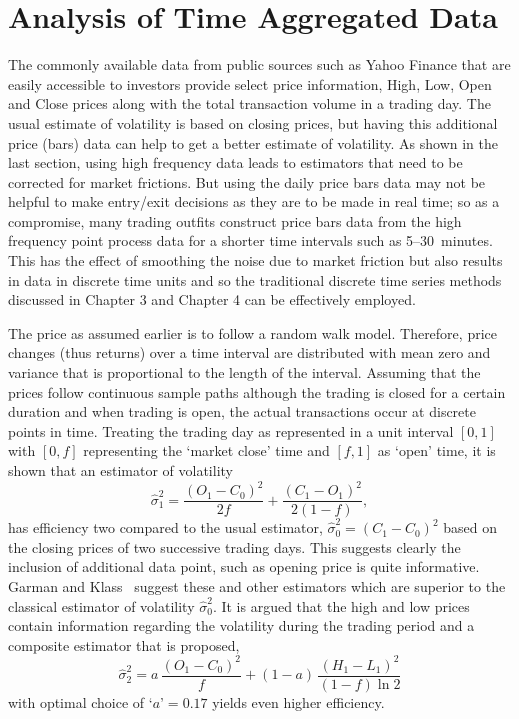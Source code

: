 \section{Analysis of Time Aggregated Data \label{s:analysis_tad}}

The commonly available data from public sources such as Yahoo Finance that are easily accessible to investors provide select price information, High, Low, Open and Close prices along with the total transaction volume in a trading day. The usual estimate of volatility is based on closing prices, but having this additional price (bars) data can help to get a better estimate of volatility. As shown in the last section, using high frequency data leads to estimators that need to be corrected for market frictions. But using the daily price bars data may not be helpful to make entry/exit decisions as they are to be made in real time; so as a compromise, many trading outfits construct price bars data from the high frequency point process data for a shorter time intervals such as 5--30~minutes. This has the effect of smoothing the noise due to market friction but also results in data in discrete time units and so the traditional discrete time series methods discussed in Chapter 3 and Chapter 4 can be effectively employed. 


The price as assumed earlier is to follow a random walk model. Therefore, price changes (thus returns) over a time interval are distributed with mean zero and variance that is proportional to the length of the interval. Assuming that the prices follow continuous sample paths although the trading is closed for a certain duration and when trading is open, the actual transactions occur at discrete points in time. Treating the trading day as represented in a unit interval $[0,1]$ with $[0,f]$ representing the `market close' time and $[f,1]$ as `open' time, it is shown that an estimator of volatility
	\begin{equation} \label{eqn:estvol}
	\hat{\sigma}_1^2= \dfrac{(O_1 - C_0)^2}{2f} + \dfrac{(C_1 - O_1)^2}{2(1-f)},
	\end{equation}
has efficiency two compared to the usual estimator, $\hat{\sigma}^2_0=(C_1 - C_0)^2$ based on the closing prices of two successive trading days. This suggests clearly the inclusion of additional data point, such as opening price is quite informative. Garman and Klass~\cite{klass1980} suggest these and other estimators which are superior to the classical estimator of volatility $\hat{\sigma}^2_0$. It is argued that the high and low prices contain information regarding the volatility during the trading period and a composite estimator that is proposed,
	\begin{equation} \label{eqn:compositeest}
	\hat{\sigma}_2^2= a\,\dfrac{(O_1 - C_0)^2}{f} + (1-a)\, \dfrac{(H_1 - L_1)^2}{(1-f) \ln 2}
	\end{equation}
with optimal choice of `$a$'$=0.17$ yields even higher efficiency.


